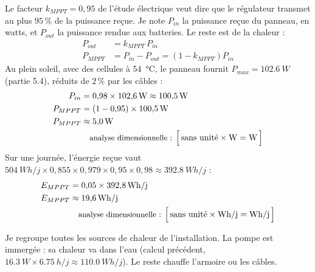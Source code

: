 \begin{demonstration}
Le facteur $k_{MPPT} = 0{,}95$ de l'étude électrique veut dire que le régulateur transmet au plus $95\,\%$ de la puissance reçue. Je note $P_{in}$ la puissance reçue du panneau, en watts, et $P_{out}$ la puissance rendue aux batteries. Le reste est de la chaleur :
\begin{align*}
P_{out} &= k_{MPPT}\,P_{in}\\
P_{MPPT} &= P_{in} - P_{out} = \left(1 - k_{MPPT}\right)P_{in}
\end{align*}
Au plein soleil, avec des cellules à \qty{54}{\celsius}, le panneau fournit $P_{max} = \qty{102,6}{W}$ (partie 5.4), réduits de $2\,\%$ par les câbles :
\begin{align*}
P_{in} &= 0{,}98 \times \qty{102,6}{W} \approx \qty{100,5}{W}\\
P_{MPPT} &= (1 - 0{,}95) \times \qty{100,5}{W}\\
P_{MPPT} &\approx \qty{5,0}{W}\\
\dimline{\text{sans unité}\times\unit{W}=\unit{W}}
\end{align*}
Sur une journée, l'énergie reçue vaut $\qty{504}{Wh/j} \times 0{,}855 \times 0{,}979 \times 0{,}95 \times 0{,}98 \approx \qty{392,8}{Wh/j}$ :
\begin{align*}
E_{MPPT} &= 0{,}05 \times \qty{392,8}{Wh/j}\\
E_{MPPT} &\approx \qty{19,6}{Wh/j}\\
\dimline{\text{sans unité}\times\unit{Wh/j}=\unit{Wh/j}}
\end{align*}
\end{demonstration}

Je regroupe toutes les sources de chaleur de l'installation. La pompe est immergée : sa chaleur va dans l'eau (calcul précédent, $\qty{16,3}{W} \times \qty{6,75}{h/j} \approx \qty{110,0}{Wh/j}$). Le reste chauffe l'armoire ou les câbles.

